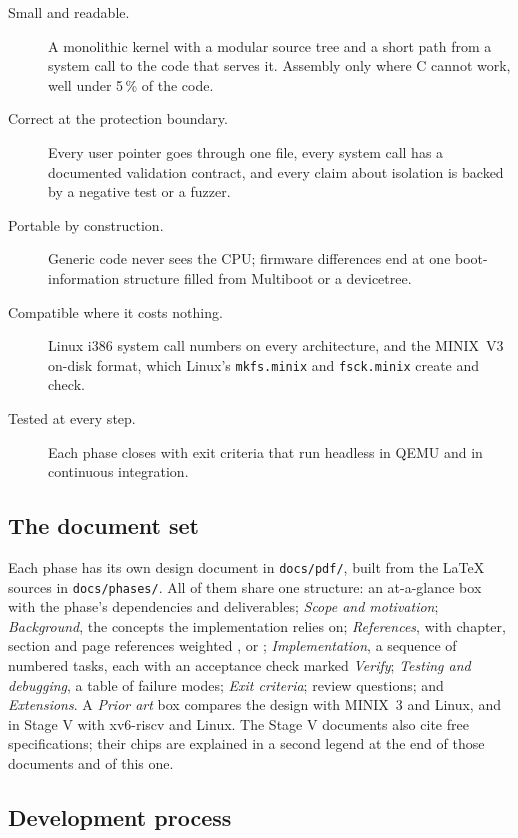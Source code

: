 \documentclass[11pt,a4paper]{article}
\begin{document}
\begin{description}
  \item[Small and readable.] A monolithic kernel with a modular source tree and a short path from a system call to
    the code that serves it. Assembly only where C cannot work, well under 5\,\% of the code.
  \item[Correct at the protection boundary.] Every user pointer goes through one file, every system call has a
    documented validation contract, and every claim about isolation is backed by a negative test or a fuzzer.
  \item[Portable by construction.] Generic code never sees the CPU; firmware differences end at one boot-information
    structure filled from Multiboot or a devicetree.
  \item[Compatible where it costs nothing.] Linux i386 system call numbers on every architecture, and the MINIX~V3
    on-disk format, which Linux's \texttt{mkfs.minix} and \texttt{fsck.minix} create and check.
  \item[Tested at every step.] Each phase closes with exit criteria that run headless in QEMU and in continuous
    integration.
\end{description}

\subsection{The document set}

Each phase has its own design document in \texttt{docs/pdf/}, built from the LaTeX sources in \texttt{docs/phases/}.
All of them share one structure: an at-a-glance box with the phase's dependencies and deliverables; \emph{Scope and
motivation}; \emph{Background}, the concepts the implementation relies on; \emph{References}, with chapter, section
and page references weighted \must, \should or \could; \emph{Implementation}, a sequence of numbered tasks, each
with an acceptance check marked \emph{Verify}; \emph{Testing and debugging}, a table of failure modes; \emph{Exit
criteria}; review questions; and \emph{Extensions}. A \emph{Prior art} box compares the design with MINIX~3 and
Linux, and in Stage V with xv6-riscv and Linux. The Stage V documents also cite free specifications; their chips are
explained in a second legend at the end of those documents and of this one.

\subsection{Development process}
\end{document}
